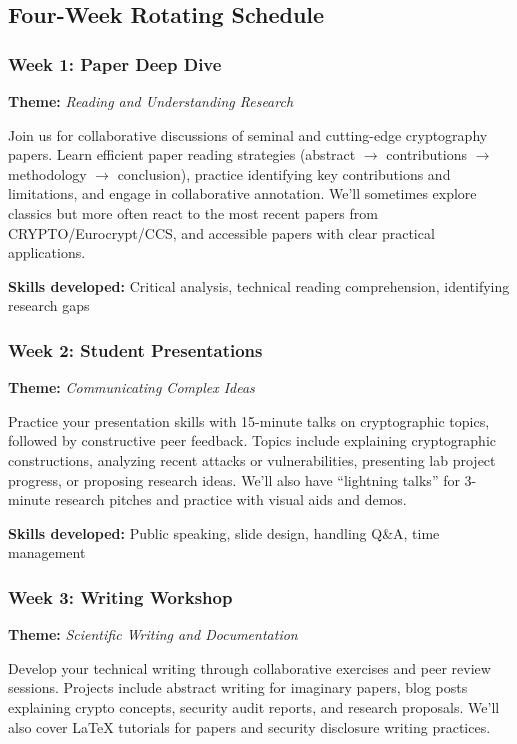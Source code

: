 \documentclass[10pt,a4paper,american]{article}
\begin{document}
\subsection{Four-Week Rotating Schedule}

\subsubsection*{Week 1: Paper Deep Dive}
\textbf{Theme:} \textit{Reading and Understanding Research}

Join us for collaborative discussions of seminal and cutting-edge cryptography papers. Learn efficient paper reading strategies (abstract $\rightarrow$ contributions $\rightarrow$ methodology $\rightarrow$ conclusion), practice identifying key contributions and limitations, and engage in collaborative annotation. We'll sometimes explore classics but more often react to the most recent papers from CRYPTO/Eurocrypt/CCS, and accessible papers with clear practical applications.

\textbf{Skills developed:} Critical analysis, technical reading comprehension, identifying research gaps

\subsubsection*{Week 2: Student Presentations}
\textbf{Theme:} \textit{Communicating Complex Ideas}

Practice your presentation skills with 15-minute talks on cryptographic topics, followed by constructive peer feedback. Topics include explaining cryptographic constructions, analyzing recent attacks or vulnerabilities, presenting lab project progress, or proposing research ideas. We'll also have ``lightning talks'' for 3-minute research pitches and practice with visual aids and demos.

\textbf{Skills developed:} Public speaking, slide design, handling Q\&A, time management

\subsubsection*{Week 3: Writing Workshop}
\textbf{Theme:} \textit{Scientific Writing and Documentation}

Develop your technical writing through collaborative exercises and peer review sessions. Projects include abstract writing for imaginary papers, blog posts explaining crypto concepts, security audit reports, and research proposals. We'll also cover LaTeX tutorials for papers and security disclosure writing practices.
\end{document}
